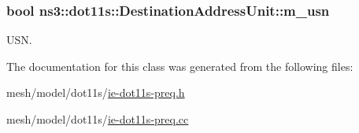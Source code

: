 \subsubsection[{\texorpdfstring{m\+\_\+usn}{m_usn}}]{\setlength{\rightskip}{0pt plus 5cm}bool ns3\+::dot11s\+::\+Destination\+Address\+Unit\+::m\+\_\+usn\hspace{0.3cm}{\ttfamily [private]}}\hypertarget{classns3_1_1dot11s_1_1DestinationAddressUnit_aeaf0a74ac7cdf4d70e41d6b494d27bec}{}\label{classns3_1_1dot11s_1_1DestinationAddressUnit_aeaf0a74ac7cdf4d70e41d6b494d27bec}


U\+SN. 



The documentation for this class was generated from the following files\+:\begin{DoxyCompactItemize}
\item 
mesh/model/dot11s/\hyperlink{ie-dot11s-preq_8h}{ie-\/dot11s-\/preq.\+h}\item 
mesh/model/dot11s/\hyperlink{ie-dot11s-preq_8cc}{ie-\/dot11s-\/preq.\+cc}\end{DoxyCompactItemize}
